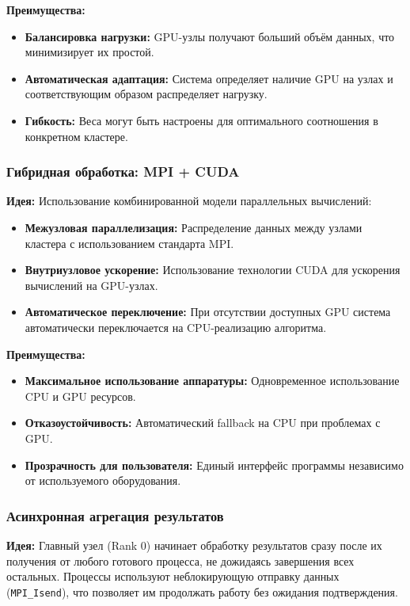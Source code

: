 \documentclass[areaset=advanced]{scrartcl}
\begin{document}
\textbf{Преимущества:}
\begin{itemize}
    \item \textbf{Балансировка нагрузки:} GPU-узлы получают больший объём данных, что минимизирует их простой.
    \item \textbf{Автоматическая адаптация:} Система определяет наличие GPU на узлах и соответствующим образом распределяет нагрузку.
    \item \textbf{Гибкость:} Веса могут быть настроены для оптимального соотношения в конкретном кластере.
\end{itemize}

\subsubsection{Гибридная обработка: MPI + CUDA}

\textbf{Идея:} Использование комбинированной модели параллельных вычислений:
\begin{itemize}
    \item \textbf{Межузловая параллелизация:} Распределение данных между узлами кластера с использованием стандарта MPI.
    \item \textbf{Внутриузловое ускорение:} Использование технологии CUDA для ускорения вычислений на GPU-узлах.
    \item \textbf{Автоматическое переключение:} При отсутствии доступных GPU система автоматически переключается на CPU-реализацию алгоритма.
\end{itemize}

\textbf{Преимущества:}
\begin{itemize}
    \item \textbf{Максимальное использование аппаратуры:} Одновременное использование CPU и GPU ресурсов.
    \item \textbf{Отказоустойчивость:} Автоматический fallback на CPU при проблемах с GPU.
    \item \textbf{Прозрачность для пользователя:} Единый интерфейс программы независимо от используемого оборудования.
\end{itemize}

\subsubsection{Асинхронная агрегация результатов}

\textbf{Идея:} Главный узел (Rank 0) начинает обработку результатов сразу после их получения от любого готового процесса, не дожидаясь завершения всех остальных. Процессы используют неблокирующую отправку данных (\texttt{MPI\_Isend}), что позволяет им продолжать работу без ожидания подтверждения.
\end{document}
